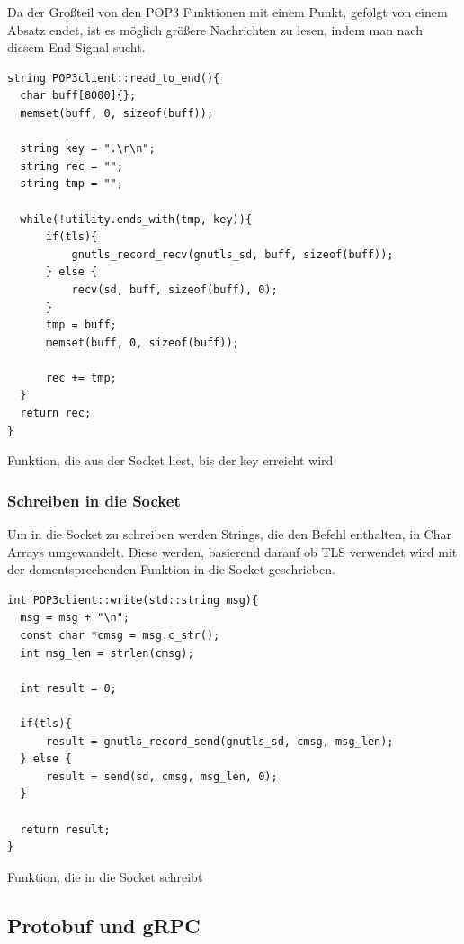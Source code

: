 \documentclass[12pt, letterpaper]{article}
\newenvironment{code}{\captionsetup{type=listing}}{}
\begin{document}
Da der Großteil von den POP3 Funktionen mit einem Punkt, gefolgt von einem Absatz endet, ist es möglich größere Nachrichten zu lesen, indem man nach diesem End-Signal sucht.

\begin{code}
\begin{verbatim}
string POP3client::read_to_end(){
  char buff[8000]{};
  memset(buff, 0, sizeof(buff));

  string key = ".\r\n";
  string rec = "";
  string tmp = "";

  while(!utility.ends_with(tmp, key)){
      if(tls){
          gnutls_record_recv(gnutls_sd, buff, sizeof(buff));
      } else {
          recv(sd, buff, sizeof(buff), 0);
      }
      tmp = buff;
      memset(buff, 0, sizeof(buff));

      rec += tmp;
  }
  return rec;
}
\end{verbatim}
\caption{Funktion, die aus der Socket liest, bis der key erreicht wird}
\label{create_gnutls}
\end{code}

\subsubsection{Schreiben in die Socket}

Um in die Socket zu schreiben werden Strings, die den Befehl enthalten, in Char Arrays umgewandelt. Diese werden, basierend darauf ob TLS verwendet wird mit der dementsprechenden Funktion in die Socket geschrieben.

\begin{code}
\begin{verbatim}
int POP3client::write(std::string msg){
  msg = msg + "\n";
  const char *cmsg = msg.c_str();
  int msg_len = strlen(cmsg);

  int result = 0;

  if(tls){
      result = gnutls_record_send(gnutls_sd, cmsg, msg_len);
  } else {
      result = send(sd, cmsg, msg_len, 0);
  }

  return result;
}
\end{verbatim}
\caption{Funktion, die in die Socket schreibt}
\label{create_gnutls}
\end{code}

\subsection{Protobuf und gRPC}
\end{document}
